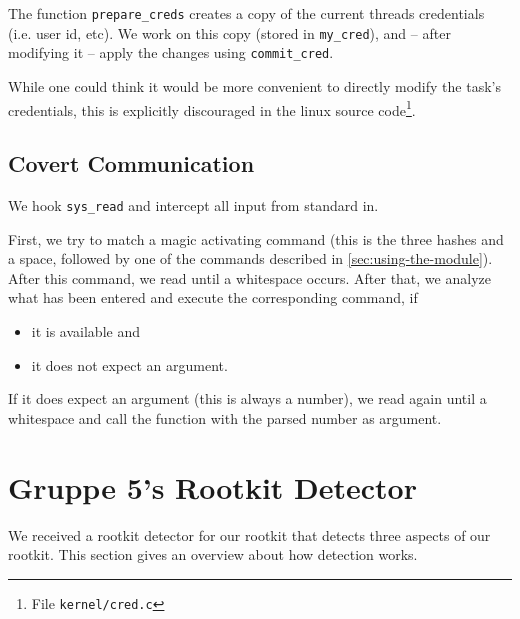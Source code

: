 \documentclass[10pt, letterpaper]{scrartcl}
\begin{document}
The function \texttt{prepare\_creds} creates a copy of the current threads credentials (i.e. user id, etc). We work on this copy (stored in \texttt{my\_cred}), and -- after modifying it -- apply the changes using \texttt{commit\_cred}.

While one could think it would be more convenient to directly modify the task's credentials, this is explicitly discouraged in the linux source code\footnote{File \texttt{kernel/cred.c}}.

\subsection{Covert Communication}
We hook \texttt{sys\_read} and intercept all input from standard in. 

First, we try to match a magic activating command (this is the three hashes and a space, followed by one of the commands described in \autoref{sec:using-the-module}). After this command, we read until a whitespace occurs. After that, we analyze what has been entered and execute the corresponding command, if 

\begin{itemize}
 \item it is available and
 \item it does not expect an argument.
\end{itemize}

If it does expect an argument (this is always a number), we read again until a whitespace and call the function with the parsed number as argument.

\section{Gruppe 5's Rootkit Detector}
\label{sec:detectorofgruppe5}

We received a rootkit detector for our rootkit that detects three aspects of our rootkit. This section gives an overview about how detection works.
\end{document}

